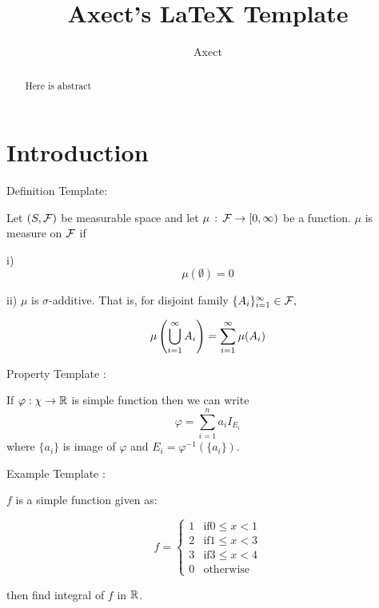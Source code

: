 \documentclass[final]{IEEEphot}
\begin{document}
\title{Axect's LaTeX Template}

\author{Axect}


\maketitle


\begin{abstract}
  Here is abstract
\end{abstract}

\tableofcontents

\newpage

\section[Introduction]{Introduction}

Definition Template:

\begin{definition}[Measure]
 Let $(S, \mathcal{F})$ be measurable space and let $\mu\,:\, \mathcal{F} \rightarrow [0,\infty)$ be a function. $\mu$ is measure on $\mathcal{F}$ if

 i) \[\mu(\emptyset) = 0\]

 ii) $\mu$ is $\sigma$-additive. That is, for disjoint family $\{A_i\}_{i=1}^\infty \in \mathcal{F}, $

 \begin{equation*}
  \mu\left( \bigcup_{i=1}^\infty A_i \right) = \sum_{i=1}^\infty \mu(A_i)
 \end{equation*}

 \HL
\end{definition}

Property Template :

\begin{property}
	\label{prop:1}
	If $\varphi:\chi \rightarrow \mathbb{R}$ is simple function then we can write
	$$\varphi = \sum_{i=1}^{n}a_iI_{E_i}$$
	where $\{a_i\}$ is image of $\varphi$ and $E_i = \varphi^{-1}(\{a_i\})$.

	\HL
\end{property}

Example Template :

\begin{example}
	$f$ is a simple function given as:

	$$ f =
	\begin{cases}
		1 & \text{if} 0 \leq x < 1 \\
		2 & \text{if} 1 \leq x < 3 \\
		3 & \text{if} 3 \leq x < 4 \\
		0 & \text{otherwise}
	\end{cases}
	$$

	then find integral of $f$ in $\mathbb{R}$.

	\HL
\end{example}
\end{document}
